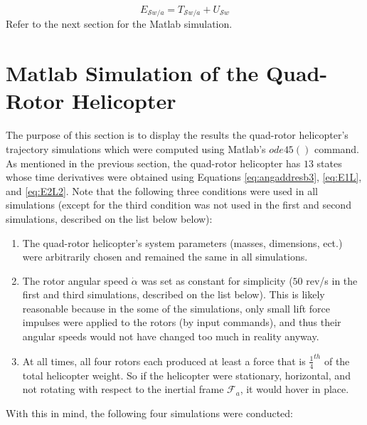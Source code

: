 \documentclass[journal]{IEEEtran}
\begin{document}
\begin{equation}
E_{\mathcal{S}w/a}=T_{\mathcal{S}w/a}+U_{\mathcal{S}w}
\label{eq:totalen}
\end{equation}
Refer to the next section for the Matlab simulation. 

\section{Matlab Simulation of the Quad-Rotor Helicopter}

The purpose of this section is to display the results the quad-rotor helicopter's trajectory simulations which were computed using Matlab's $ode45()$ command. As mentioned in the previous section, the quad-rotor helicopter has $13$ states whose time derivatives were obtained using Equations \ref{eq:angaddresb3}, \ref{eq:E1L}, and \ref{eq:E2L2}. Note that the following three conditions were used in all simulations (except for the third condition was not used in the first and second simulations, described on the list below below):

\begin{enumerate}
\item The quad-rotor helicopter's system parameters (masses, dimensions, ect.) were arbitrarily chosen and remained the same in all simulations. 
\item The rotor angular speed $\dot{\alpha}$ was set as constant for simplicity ($50$ rev/s in the first and third simulations, described on the list below). This is likely reasonable because in the some of the simulations, only small lift force impulses were applied to the rotors (by input commands), and thus their angular speeds would not have changed too much in reality anyway.
\item At all times, all four rotors each produced at least a force that is $\frac{1}{4}^{th}$ of the total helicopter weight. So if the helicopter were stationary, horizontal, and not rotating with respect to the inertial frame $\mathcal{F}_a$, it would hover in place.
\end{enumerate} 

With this in mind, the following four simulations were conducted:
\end{document}
